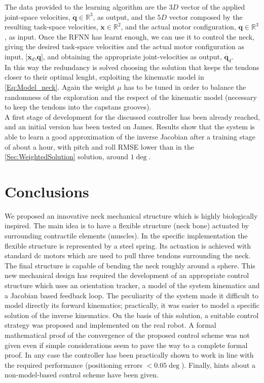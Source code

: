 \documentclass[conference]{IEEEtran}
\numberwithin{equation}{section}
\newcommand{\A}{\mathcal{A}}
\newcommand{\q}{\mathbf{q}}
\newcommand{\x}{\mathbf{x}}
\begin{document}
The data provided to the learning algorithm are the $3D$ vector of the applied joint-space velocities, $\dot{\q}\in\mathbb R^3$, as output, and the $5D$ vector composed by the resulting task-space velocities, $\dot{\x}\in\mathbb R^2$, and the actual motor configuration, $\q\in\mathbb R^3$, as input. Once the RFNN has learnt enough, we can use it to control the neck, giving the desired task-space velocities and the actual motor configuration as input, $[\dot{\x_d}$,$\q]$, and obtaining the appropriate joint-velocities as output, $\dot{\q_d}$. \\In this way the redundancy is solved choosing the solution that keeps the tendons closer to their optimal lenght, exploiting the kinematic model in \ref{Eq:Model_neck}. Again the weight $\mu$ has to be tuned in order to balance the randomness of the exploration and the respect of the kinematic model (necessary to keep the tendons into the capstans grooves).\\A first stage of development for the discussed controller has been already reached, and an initial version has been tested on James. Results show that the system is able to learn a good approximation of the inverse Jacobian after a training stage of about a hour, with pitch and roll RMSE lower than in the \ref{Sec:WeightedSolution} solution, around $1 \deg$.


\section{Conclusions} \label{Sec:Conclusions}
We proposed an innovative neck mechanical structure which is highly biologically inspired. The main idea is to have a flexible structure (neck bone) actuated by surrounding contractile elements (muscles). In the specific implementation the flexible structure is represented by a steel spring. Its actuation is achieved with standard dc motors which are used to pull three tendons surrounding the neck. The final structure is capable of bending the neck roughly around a sphere. This new mechanical design has required the development of an appropriate control structure which uses an orientation tracker, a model of the system kinematics and a Jacobian based feedback loop. The peculiarity of the system made it difficult to model directly its forward kinematics; practically, it was easier to model a specific solution of the inverse kinematics. On the basis of this solution, a suitable control strategy was proposed and implemented on the real robot. A formal mathematical proof of the convergence of the proposed control scheme was not given even if simple considerations seem to pave the way to a complete formal proof. In any case the controller has been practically shown to work in line with the required performance (positioning errors $<0.05 \deg$). Finally, hints about a non-model-based control scheme have been given.
\end{document}
